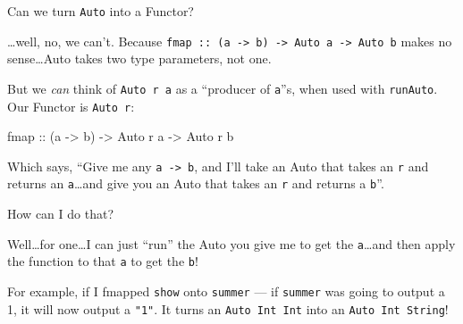 \documentclass[]{article}
\newenvironment{Shaded}{}{}
\newcommand{\CommentTok}[1]{\textcolor[rgb]{0.38,0.63,0.69}{\textit{#1}}}
\newcommand{\DataTypeTok}[1]{\textcolor[rgb]{0.56,0.13,0.00}{#1}}
\newcommand{\FunctionTok}[1]{\textcolor[rgb]{0.02,0.16,0.49}{#1}}
\newcommand{\KeywordTok}[1]{\textcolor[rgb]{0.00,0.44,0.13}{\textbf{#1}}}
\newcommand{\NormalTok}[1]{#1}
\newcommand{\OtherTok}[1]{\textcolor[rgb]{0.00,0.44,0.13}{#1}}
\begin{document}
Can we turn \texttt{Auto} into a Functor?

\ldots{}well, no, we can't. Because
\texttt{fmap\ ::\ (a\ -\textgreater{}\ b)\ -\textgreater{}\ Auto\ a\ -\textgreater{}\ Auto\ b}
makes no sense\ldots{}Auto takes two type parameters, not one.

But we \emph{can} think of \texttt{Auto\ r\ a} as a ``producer of \texttt{a}''s,
when used with \texttt{runAuto}. Our Functor is \texttt{Auto\ r}:

\begin{Shaded}
\begin{Highlighting}[]
\NormalTok{fmap}\OtherTok{ ::}\NormalTok{ (a }\OtherTok{->}\NormalTok{ b) }\OtherTok{->} \DataTypeTok{Auto}\NormalTok{ r a }\OtherTok{->} \DataTypeTok{Auto}\NormalTok{ r b}
\end{Highlighting}
\end{Shaded}

Which says, ``Give me any \texttt{a\ -\textgreater{}\ b}, and I'll take an Auto
that takes an \texttt{r} and returns an \texttt{a}\ldots{}and give you an Auto
that takes an \texttt{r} and returns a \texttt{b}''.

How can I do that?

Well\ldots{}for one\ldots{}I can just ``run'' the Auto you give me to get the
\texttt{a}\ldots{}and then apply the function to that \texttt{a} to get the
\texttt{b}!

For example, if I fmapped \texttt{show} onto \texttt{summer} --- if
\texttt{summer} was going to output a 1, it will now output a \texttt{"1"}. It
turns an \texttt{Auto\ Int\ Int} into an \texttt{Auto\ Int\ String}!

\begin{Shaded}
\end{Shaded}
\end{document}
